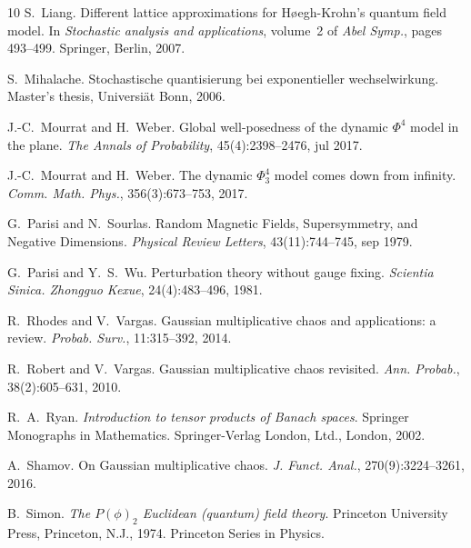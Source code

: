\documentclass[a4paper,10pt]{article}
\newcommand{\tmtextit}[1]{{\itshape{#1}}}
\begin{document}
\begin{thebibliography}{10}
  S.~Liang. {\newblock}Different lattice approximations for
  H{\o}egh-Krohn's quantum field model. {\newblock}In \tmtextit{Stochastic
  analysis and applications},  volume~2  of \tmtextit{Abel Symp.},  pages 
  493--499. Springer, Berlin, 2007.{\newblock}
  
  S.~Mihalache. {\newblock}Stochastische quantisierung bei
  exponentieller wechselwirkung. {\newblock}Master's thesis, Universi{\"a}t
  Bonn, 2006.{\newblock}
  
  J.-C.~Mourrat  and  H.~Weber. {\newblock}Global
  well-posedness of the dynamic $\Phi^4$ model in the plane.
  {\newblock}\tmtextit{The Annals of Probability}, 45(4):2398--2476, jul
  2017.{\newblock}
  
  J.-C.~Mourrat  and  H.~Weber. {\newblock}The dynamic
  $\Phi^4_3$ model comes down from infinity. {\newblock}\tmtextit{Comm. Math.
  Phys.}, 356(3):673--753, 2017.{\newblock}
  
  G.~Parisi  and  N.~Sourlas.
  {\newblock}Random Magnetic Fields, Supersymmetry, and Negative Dimensions.
  {\newblock}\tmtextit{Physical Review Letters}, 43(11):744--745, sep
  1979.{\newblock}
  
  G.~Parisi  and  Y.~S.~Wu.
  {\newblock}Perturbation theory without gauge fixing.
  {\newblock}\tmtextit{Scientia Sinica. Zhongguo Kexue}, 24(4):483--496,
  1981.{\newblock}
  
  R.~Rhodes  and  V.~Vargas. {\newblock}Gaussian
  multiplicative chaos and applications: a review.
  {\newblock}\tmtextit{Probab. Surv.}, 11:315--392, 2014.{\newblock}
  
  R.~Robert  and  V.~Vargas. {\newblock}Gaussian
  multiplicative chaos revisited. {\newblock}\tmtextit{Ann. Probab.},
  38(2):605--631, 2010.{\newblock}
  
  R.~A.~Ryan. {\newblock}\tmtextit{Introduction to
  tensor products of Banach spaces}. {\newblock}Springer Monographs in
  Mathematics. Springer-Verlag London, Ltd., London, 2002.{\newblock}
  
  A.~Shamov. {\newblock}On Gaussian multiplicative chaos.
  {\newblock}\tmtextit{J. Funct. Anal.}, 270(9):3224--3261, 2016.{\newblock}
  
  B.~Simon. {\newblock}\tmtextit{The $P (\phi)_2$
  Euclidean (quantum) field theory}. {\newblock}Princeton University Press,
  Princeton, N.J., 1974. {\newblock}Princeton Series in Physics.{\newblock}
  

\end{thebibliography}
\end{document}
